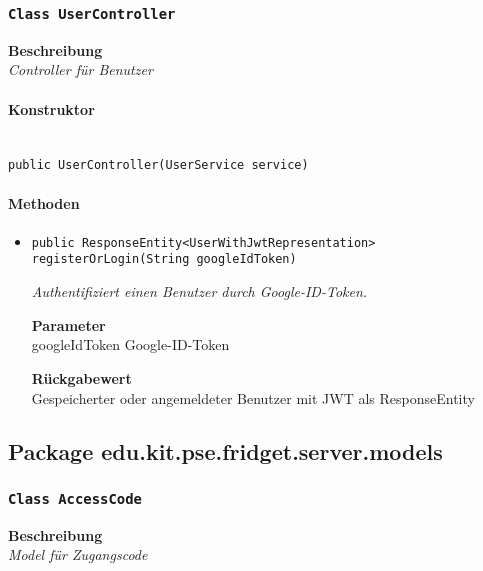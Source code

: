     \subsubsection{\texttt{Class UserController}}
    \textbf{Beschreibung} \\
    \textit{Controller für Benutzer}
    \paragraph*{Konstruktor}\mbox{} \\
    \texttt{public UserController(UserService service)} \\
    \paragraph*{Methoden}
    \begin{itemize}
    	\item{\texttt{public ResponseEntity<UserWithJwtRepresentation> registerOrLogin(String googleIdToken)}}
    	
    	\textit{Authentifiziert einen Benutzer durch Google-ID-Token.}
    	
    	\textbf{Parameter} \\
    	googleIdToken Google-ID-Token
    	
    	\textbf{Rückgabewert} \\
    	Gespeicherter oder angemeldeter Benutzer mit JWT als ResponseEntity
    \end{itemize}
    \subsection{Package edu.kit.pse.fridget.server.models}
    \subsubsection{\texttt{Class AccessCode}}
    \textbf{Beschreibung} \\
    \textit{Model für Zugangscode}

